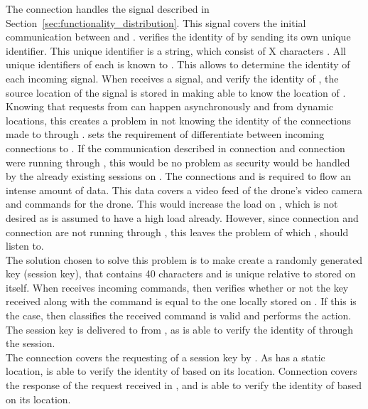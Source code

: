 The connection  handles the signal described in Section~\ref{sec:functionality_distribution}.
This signal covers the initial communication between  and .  verifies the identity of  by  sending its own unique identifier.
This unique identifier is a string, which consist of X characters .
All unique identifiers of each  is known to .
This allows  to determine the identity of each incoming signal. When  receives a signal, and verify the identity of , the source location of the signal is stored in  making  able to know the location of . \\

Knowing that requests from  can happen asynchronously and from dynamic locations, this creates a problem in not knowing the identity of the connections made to  through .
 sets the requirement of differentiate between incoming connections to .
If the communication described in connection  and connection  were running through , this would be no problem as security would be handled by the already existing sessions on .
The connections  and  is required to flow an intense amount of data.
This data covers a video feed of the drone's video camera and commands for the drone.
This would increase the load on , which is not desired as  is assumed to have a high load already.
However, since connection  and connection  are not running through , this leaves the problem of which ,  should listen to. \\

The solution chosen to solve this problem is to make  create a randomly generated key (session key), that contains 40 characters and is unique relative to  stored on  itself.
When  receives incoming commands, then  verifies whether or not the key received along with the command is equal to the one locally stored on .
If this is the case, then  classifies the received command is valid and performs the action.
The session key is delivered to  from , as  is able to verify the identity of  through the session. \\

The connection  covers the requesting of a session key by .
As  has a static location,  is able to verify the identity of  based on its location.
Connection  covers the response of the request received in , and  is able to verify the identity of  based on its location. \\

